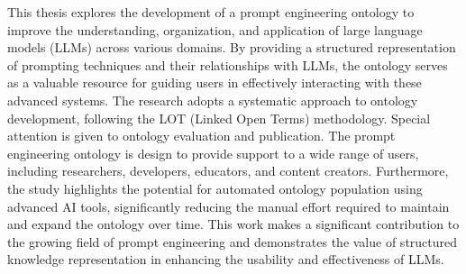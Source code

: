 This thesis explores the development of a prompt engineering ontology to improve the understanding, organization, and application of large language models (LLMs) across various domains. By providing a structured representation of prompting techniques and their relationships with LLMs, the ontology serves as a valuable resource for guiding users in effectively interacting with these advanced systems. The research adopts a systematic approach to ontology development, following the LOT (Linked Open Terms) methodology. Special attention is given to ontology evaluation and publication. The prompt engineering ontology is design to provide support to a wide range of users, including researchers, developers, educators, and content creators. Furthermore, the study highlights the potential for automated ontology population using advanced AI tools, significantly reducing the manual effort required to maintain and expand the ontology over time. This work makes a significant contribution to the growing field of prompt engineering and demonstrates the value of structured knowledge representation in enhancing the usability and effectiveness of LLMs.